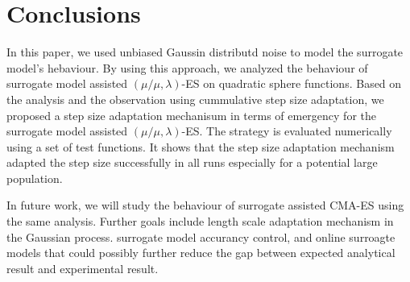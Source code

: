 







\section{Conclusions}
In this paper, we used unbiased Gaussin distributd noise to model the surrogate model's hebaviour. By using this approach, we analyzed the behaviour of surrogate model assisted $(\mu/\mu,\lambda)$-ES on quadratic sphere functions. Based on the analysis and the observation using cummulative step size adaptation, we proposed a step size adaptation mechanisum in terms of emergency for the surrogate model assisted $(\mu/\mu,\lambda)$-ES. The strategy is evaluated numerically using a set of test functions. It shows that the step size adaptation mechanism adapted the step size successfully in all runs especially for a potential large population.

In future work, we will study the behaviour of surrogate assisted CMA-ES using the same analysis. Further goals include length scale adaptation mechanism in the Gaussian process. surrogate model accurancy control, and online surroagte models that could possibly further reduce the gap between expected analytical result and experimental result. 







